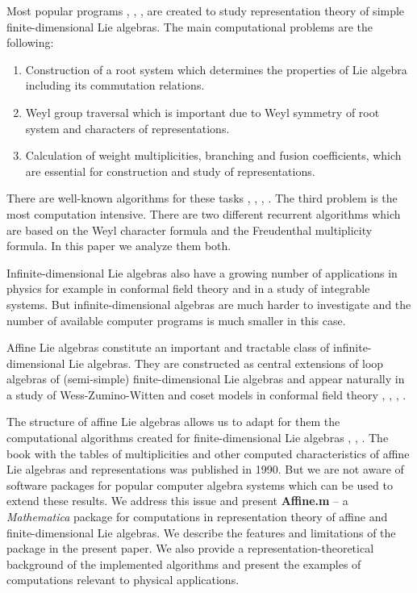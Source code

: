 \documentclass[preprint,12pt]{elsarticle}
\begin{document}
Most popular programs \cite{simplie}, \cite{vanleeuwen1994lsp}, \cite{fischbacher2002ilp}, \cite{coxweyl} are created to study representation theory of simple finite-dimensional Lie algebras. The main computational problems are the following:
\begin{enumerate}
\item Construction of a root system which determines the properties of Lie algebra including its commutation relations.
\item Weyl group traversal which is important due to Weyl symmetry of root system and characters of representations.
\item Calculation of weight multiplicities, branching and fusion coefficients, which are essential for construction and study of representations.
\end{enumerate}
There are well-known algorithms for these tasks \cite{moody1982fast}, \cite{stembridge2001computational}, \cite{belinfante1989survey}, \cite{casselman1994machine}.
The third problem is the most computation intensive. There are two different recurrent algorithms which are based on the Weyl character formula and the Freudenthal multiplicity formula. In this paper we analyze them both.

Infinite-dimensional Lie algebras also have a growing number of applications in physics for example in conformal field theory and in a study of  integrable systems. But infinite-dimensional algebras are much harder to investigate and the number of available computer programs is much smaller in this case.

Affine Lie algebras \cite{kac1990idl} constitute an important and tractable class of infinite-dimensional Lie algebras. They are constructed as central extensions of loop algebras of (semi-simple) finite-dimensional Lie algebras and appear naturally in a study of Wess-Zumino-Witten and coset models in conformal field theory \cite{Walton:1999xc}, \cite{difrancesco1997cft}, \cite{Goddard198588}, \cite{Dunbar:1992gh}.

The structure of affine Lie algebras allows us to adapt for them the computational algorithms created for finite-dimensional Lie algebras  \cite{Fuchs:1996dd}, \cite{gannon2001algorithms}, \cite{kass1990ala}. The book \cite{kass1990ala} with the tables of multiplicities and other computed characteristics of affine Lie algebras and representations was published in 1990. But we are not aware of software packages for popular computer algebra systems which can be used to extend these results.
We address this issue and present {\bf Affine.m} -- a {\it Mathematica} package for computations in representation theory of affine and finite-dimensional Lie algebras.  We describe the features and limitations of the package in the present paper.  We also provide a representation-theoretical background of the implemented algorithms and present the examples of computations relevant to physical applications.
\end{document}
